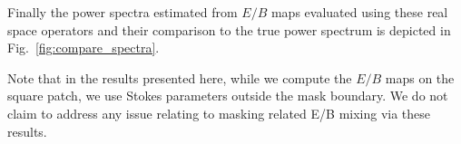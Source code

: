 \documentclass[12pt]{article}
\begin{document}
%
Finally the power spectra estimated from $E/B$ maps evaluated using these real space operators and their comparison to the true power spectrum is depicted in Fig.~\ref{fig:compare_spectra}. 

Note that in the results presented here, while we compute the $E/B$ maps on the square patch, we use Stokes parameters outside the mask boundary. We do not claim to address any issue relating to masking related E/B mixing via these results.
\end{document}

